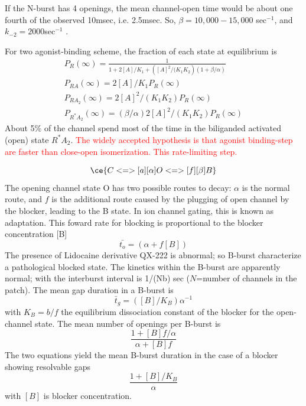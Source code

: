 If the N-burst has 4 openings, the mean channel-open time would be about one
fourth of the observed 10msec, i.e. 2.5msec. So, $\beta=10,000-15,000$
sec$^{-1}$, and $k_{-2}=2000$sec$^{-1}$ \citep{colquhoun1981fmt}.

For two agonist-binding scheme, the fraction of each state at equilibrium is
\begin{eqnarray}
P_R(\infty) = \frac{1}{1+2[A]/K_1 + \left([A]^2/(K_1K_2\right) (1+\beta/\alpha)
}
\\
P_{RA}(\infty)=2[A]/K_1 P_R(\infty) \\
P_{RA_2}(\infty) = 2[A]^2/(K_1K_2) P_R(\infty)\\
P_{R^*A_2}(\infty) = (\beta/\alpha)2[A]^2/(K_1K_2) P_R(\infty)
\end{eqnarray}
About 5\% of the channel spend most of the time in the biliganded activated
(open) state $R^*A_2$. \textcolor{red}{The widely accepted hypothesis is that
agonist binding-step are faster than close-open isomerization. This rate-limiting step.}


\begin{equation}
\ce{C <=>[a][\alpha] O <=>[f][\beta] B}
\end{equation}
The opening channel state O has two possible routes to decay: $\alpha$ is the
normal route, and $f$ is the additional route caused by the plugging of open
channel by the blocker, leading to the B state. In ion channel gating, this is
known as adaptation. This foward rate for blocking is proportional to the
blocker concentration [B]
\begin{equation}
\bar{t_o}=(\alpha + f[B])
\end{equation}
The presence of Lidocaine derivative QX-222 is abnormal; so B-burst characterize
a pathological blocked state. The kinetics within the B-burst are apparently
normal; with the interburst interval is 1/(Nb) sec ($N$=number of channels in
the patch). The mean gap duration in a B-burst is
\begin{equation}
\bar{t}_g  = ([B]/K_B) \alpha^{-1}
\end{equation}
with $K_B=b/f$ the equilibrium dissociation constant of the blocker for the
open-channel state. The mean number of openings per B-burst is
\begin{equation}
\frac{1+[B]f/\alpha}{\alpha+[B]f}
\end{equation}
The two equations yield the mean B-burst duration in the case of a blocker
showing resolvable gaps
\begin{equation}
\frac{1+[B]/K_B}{\alpha}
\end{equation}
with $[B]$ is blocker concentration.

